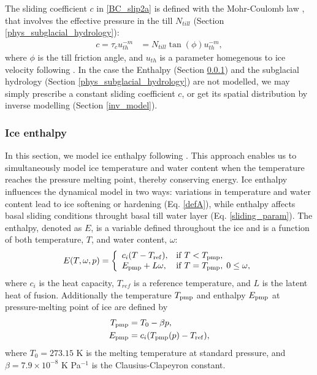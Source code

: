 \documentclass[10pt,twocolumn]{article}
\begin{document}
The sliding coefficient $c$ in \eqref{BC_slip2a} is defined with the Mohr-Coulomb law
\citep{Cuffey.2010}, that involves the effective pressure in the till $N_{till}$
(Section \ref{phys_subglacial_hydrology}):
\begin{align}
c  = \tau_c u_{th}^{-m} & = N_{till} \tan(\phi) u_{th}^{-m}, 
\label{sliding_param}
\end{align}
where $\phi$ is the till friction angle, and $u_{th}$ is a parameter homegenous to ice velocity
following \citet{pism-user-manual}.
In the case the Enthalpy (Section \ref{phys_enthalpy}) and the subglacial hydrology
(Section \ref{phys_subglacial_hydrology}) are not modelled, we may simply prescribe 
a constant sliding coefficient $c$, or get its spatial distribution by inverse modelling
(Section \ref{inv_model}).
 
\subsubsection{Ice enthalpy}
\label{phys_enthalpy}

In this section, we model ice enthalpy following \citet{aschwanden2012enthalpy}.
This approach enables us to simultaneously model ice 
temperature and water content when the temperature reaches the pressure melting point, 
thereby conserving energy. Ice enthalpy influences the dynamical model in two ways: 
variations in temperature and water content lead to ice softening or hardening (Eq. \eqref{defA}), 
while enthalpy affects basal sliding conditions throught basal till water layer (Eq. \eqref{sliding_param}). 
The enthalpy, denoted as $E$, is a variable defined throughout the ice and 
is a function of both temperature, $T$, and water content, $\omega$:
\begin{align}
\label{def_enth}
E(T, \omega,p) = 
\left\{
\begin{array}{ll}
c_i (T- T_{\rm ref}), & {\rm  if } \; T < T_{\rm pmp} , \\ 
E_{\rm pmp} + L \omega, &  
{\rm if } \;  T = T_{\rm pmp},\; 0 \le \omega,
\end{array} 
\right.  
\end{align}
where $c_i$ is the heat capacity, $T_{ref}$ is a reference temperature, 
and $L$ is the latent heat of fusion. Additionally the temperature $T_{\rm pmp}$
and enthalpy $E_{\rm pmp}$ at pressure-melting point of ice are defined by   
\begin{align}
T_{\rm pmp} & = T_0 - \beta p, \label{defTpmp} \\
E_{\rm pmp} & = c_i (T_{\rm pmp}(p) - T_{\rm ref}), \label{defEpmp}
\end{align}  
where $T_0 = 273.15$ K is the melting temperature at standard pressure, and
$\beta = 7.9 \times 10^{-8}$ K Pa$^{-1}$ is the Clausius-Clapeyron constant. 
\end{document}
